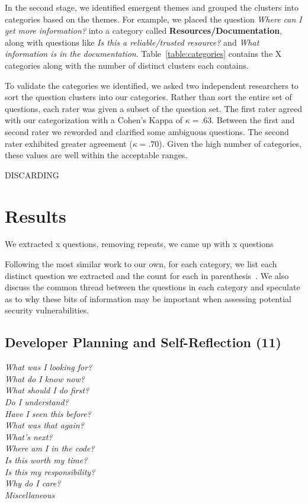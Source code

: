 \documentclass[conference]{IEEEtran}
\begin{document}
In the second stage, we identified emergent themes and grouped the clusters into categories based on the themes. 
For example, we placed the question \textit{Where can I get more information?} into a category called \textbf{Resources/Documentation}, along with questions like \textit{Is this a reliable/trusted resource?} and \textit{What information is in the documentation}. 
Table~\ref{table:categories} contains the X categories along with the number of distinct clusters each contains. 

To validate the categories we identified, we asked two independent researchers to sort the question clusters into our categories. 
Rather than sort the entire set of questions, each rater was given a subset of the question set. 
The first rater agreed with our categorization with a Cohen's Kappa of $\kappa = .63$. 
Between the first and second rater we reworded and clarified some ambiguous questions. The second rater exhibited greater agreement ($\kappa = .70$). 
Given the high number of categories, these values are well within the acceptable ranges.

DISCARDING

\section{Results}
\label{sec:results}
We extracted x questions, removing repeats, we came up with x questions

Following the most similar work to our own, for each category, we list each distinct question we extracted and the count for each in parenthesis~\cite{latoza2010hard}. We also discuss the common thread between the questions in each category and speculate as to why these bits of information may be important when assessing potential security vulnerabilities.

\noindent\subsection{\textbf{Developer Planning and Self-Reflection (11)}} 

\noindent\emph{What was I looking for?} \\
\emph{What do I know now?} \\
\emph{What should I do first?} \\
\emph{Do I understand?} \\
\emph{Have I seen this before?} \\
\emph{What was that again?} \\
\emph{What's next?} \\
\emph{Where am I in the code?} \\
\emph{Is this worth my time?} \\
\emph{Is this my responsibility?} \\
\emph{Why do I care?} \\
\emph{Miscellaneous} \\
\end{document}
